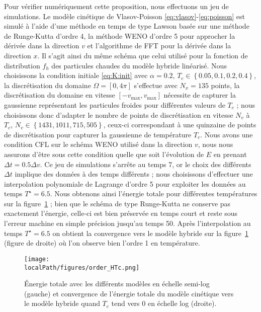 Pour vérifier numériquement cette proposition, nous effectuons un jeu de simulations. Le modèle cinétique de Vlasov-Poisson \eqref{eq:vlasov}-\eqref{eq:poisson} est simulé à l'aide d'une méthode en temps de type Lawson basée sur une méthode de Runge-Kutta d'ordre 4, la méthode WENO d'ordre 5 pour approcher la dérivée dans la direction $v$ et l'algorithme de FFT pour la dérivée dans la direction $x$. Il s'agit ainsi du même schéma que celui utilisé pour la fonction de distribution $f_h$ des particules chaudes du modèle hybride linéarisé. Nous choisissons la condition initiale \eqref{eq:K:init} avec $\alpha = 0.2$, $T_c \in \left\{ 0.05,0.1,0.2,0.4\right\}$, la discrétisation du domaine $\Omega = [0,4\pi]$ s'effectue avec $N_x = 135$ points, la discrétisation du domaine en vitesse $[-v_{\text{max}},v_{\text{max}}]$ nécessite de capturer la gaussienne représentant les particules froides pour différentes valeurs de $T_c$ ; nous choisissons donc d'adapter le nombre de points de discrétisation en vitesse $N_v$ à $T_c$, $N_v \in \left\{ 1431,1011,715,505 \right\}$, ceux-ci correspondant à une quinzaine de points de discrétisation pour capturer la gaussienne de température $T_c$. Nous avons une condition CFL sur le schéma WENO utilisé dans la direction $v$, nous nous assurons d'être sous cette condition quelle que soit l'évolution de $E$ en prenant $\Delta t = 0.5\Delta v$. Ce jeu de simulations s'arrête au temps 7, or le choix des différents $\Delta t$ implique des données à des temps différents ; nous choisissons d'effectuer une interpolation polynomiale de Lagrange d'ordre 5 pour exploiter les données au temps $T^\star = 6.5$. Nous obtenons ainsi l'énergie totale pour différentes températures sur la figure~\ref{fig:limit:totalenergy} ; bien que le schéma de type Runge-Kutta ne conserve pas exactement l'énergie, celle-ci est bien préservée en temps court et reste sous l'erreur machine en simple précision jusqu'au temps 50. Après l'interpolation au temps $T^\star = 6.5$ on obtient la convergence vers le modèle hybride sur la figure~\ref{fig:limit:totalenergy} (figure de droite) où l'on observe bien l'ordre 1 en température.
\begin{figure}[h]
  \centering
  \texttt{[image: \\localPath/figures/order\_HTc.png]}
  \caption{Énergie totale avec les différents modèles en échelle semi-log (gauche) et convergence de l'énergie totale du modèle cinétique vers le modèle hybride quand $T_c$ tend vers $0$ en échelle log (droite).}
  \label{fig:limit:totalenergy}
\end{figure}

